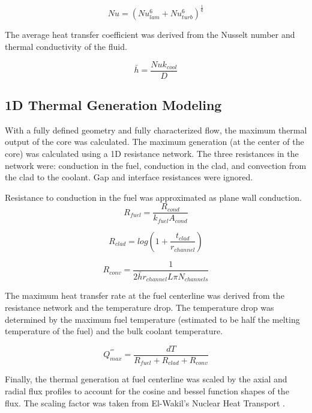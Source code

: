 \begin{equation}
    Nu = (Nu_{lam}^6 + Nu_{turb}^6)^{\frac{1}{6}}
\end{equation}

The average heat transfer coefficient was derived from the Nusselt number and
thermal conductivity of the fluid.

\begin{equation}
    \bar{h} = \frac{Nu k_{cool}}{D}
\end{equation}

\subsection{1D Thermal Generation Modeling}

With a fully defined geometry and fully characterized flow, the maximum thermal
output of the core was calculated. The maximum generation (at the center of the
core) was calculated using a 1D resistance network. The three resistances in the
network were: conduction in the fuel, conduction in the clad, and convection from
the clad to the coolant. Gap and interface resistances were ignored.

Resistance to conduction in the fuel was approximated as plane wall conduction.
\begin{equation}
    R_{fuel} =  \frac{R_{cond}}{k_{fuel}A_{cond}}
\end{equation}

\begin{equation}
    R_{clad} = log(1+\frac{t_{clad}}{r_{channel}})
\end{equation}

\begin{equation}
    R_{conv} = \frac{1}{2\bar{h}r_{channel}L\pi N_{channels}}
\end{equation}

The maximum heat transfer rate at the fuel centerline was derived from the
resistance network and the temperature drop. The temperature drop was determined
by the maximum fuel temperature (estimated to be half the melting temperature of
the fuel) and the bulk coolant temperature.

\begin{equation}
    Q^{'''}_{max} = \frac{dT}{R_{fuel} + R_{clad} + R_{conv}}
\end{equation}

Finally, the thermal generation at fuel centerline was scaled by the axial and
radial flux profiles to account for the cosine and bessel function shapes of the
flux. The scaling factor was taken from El-Wakil's Nuclear Heat Transport
\citep{heat_trans_wakil}.

